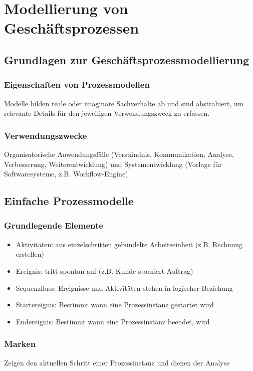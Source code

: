 \section{Modellierung von Geschäftsprozessen}

\subsection{Grundlagen zur Geschäftsprozessmodellierung}
    \subsubsection*{Eigenschaften von Prozessmodellen}
        Modelle bilden reale oder imaginäre Sachverhalte ab und sind abstrahiert, um relevante Details für den jeweiligen Verwendungszweck zu erfassen.
    \subsubsection*{Verwendungszwecke}
        Organisatorische Anwendungsfälle (Verständnis, Kommunikation, Analyse, Verbesserung, Weiterentwicklung) und Systementwicklung (Vorlage für Softwaresysteme, z.B. Workflow-Engine)

\subsection{Einfache Prozessmodelle}
    \subsubsection*{Grundlegende Elemente}
        \begin{itemize}
            \item Aktivitäten: aus einzelschritten gebündelte Arbeitseinheit (z.B. Rechnung erstellen)
            \item Ereignis: tritt spontan auf (z.B. Kunde storniert Auftrag)
            \item Sequenzfluss: Ereignisse und Aktivitäten stehen in logischer Beziehung
            \item Startereignis: Bestimmt wann eine Prozessinstanz gestartet wird
            \item Endereignis: Bestimmt wann eine Prozessinstanz beendet, wird
        \end{itemize}
    \subsubsection*{Marken}
    Zeigen den aktuellen Schritt einer Prozessinstanz und dienen der Analyse

